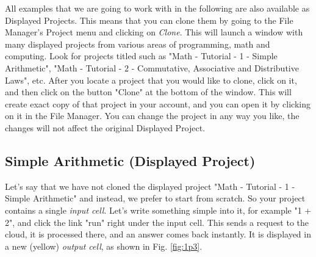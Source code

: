 \documentclass[article,A4,12pt]{llncs}
\begin{document}
All examples that we are going to work with in the following are also available 
as Displayed Projects. This means that you can clone them by going to the
File Manager's Project menu and clicking on {\em Clone}. This will launch 
a window with many displayed projects from various areas of programming,
math and computing. Look for projects titled such as "Math - Tutorial - 1 - Simple Arithmetic",
"Math - Tutorial - 2 - Commutative, Associative and Distributive Laws", etc.
After you locate a project that you would like to clone, click on it,
and then click on the button "Clone" at the bottom of the window. This will
create exact copy of that project in your account, and you can open it 
by clicking on it in the File Manager. You can change the project in any way 
you like, the changes will not affect the original Displayed Project. 

\subsection{Simple Arithmetic (Displayed Project)}

Let's say that we have not cloned the displayed project "Math - Tutorial - 1 - Simple Arithmetic"
and instead, we prefer to start from scratch.
So your project contains a single {\em input cell}. Let's write 
something simple into it, for example "1 + 2", and click 
the link "run" right under the input cell. This sends a request to 
the cloud, it is processed there, and an answer comes back instantly. 
It is displayed in a new (yellow) {\em output cell}, as shown in 
Fig. \ref{fig:1p3}.
\end{document}
